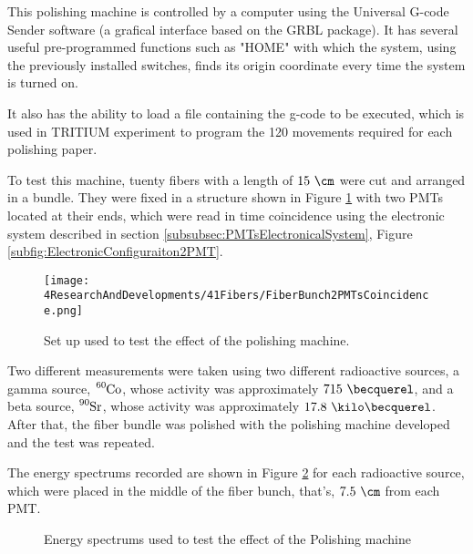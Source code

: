 This polishing machine is controlled by a computer using the Universal G-code Sender software (a grafical interface based on the GRBL package). It has several useful pre-programmed functions such as "HOME" with which the system, using the previously installed switches, finds its origin coordinate every time the system is turned on. 

It also has the ability to load a file containing the g-code to be executed, which is used in TRITIUM experiment to program the 120 movements required for each polishing paper.

To test this machine, tuenty fibers with a length of $15~\cm$ were cut and arranged in a bundle. They were fixed in a structure shown in Figure \ref{fig:BunchWith2PMTsCoincidence} with two PMTs located at their ends, which were read in time coincidence using the electronic system described in section \ref{subsubsec:PMTsElectronicalSystem}, Figure \ref{subfig:ElectronicConfiguraiton2PMT}.

\begin{figure}[]
\centering
\texttt{[image: 4ResearchAndDevelopments/41Fibers/FiberBunch2PMTsCoincidence.png]}
\caption{Set up used to test the effect of the polishing machine.\label{fig:BunchWith2PMTsCoincidence}}
\end{figure}

Two different measurements were taken using two different radioactive sources, a gamma source, $\ce{^{60}Co}$, whose activity was approximately $715~\becquerel$, and a beta source, $\ce{^{90}Sr}$, whose activity was approximately $17.8~\kilo\becquerel$. After that, the fiber bundle was polished with the polishing machine developed and the test was repeated.

The energy spectrums recorded are shown in Figure \ref{fig:ResultsOfPolishingMachine} for each radioactive source, which were placed in the middle of the fiber bunch, that's, $7.5~\cm$ from each PMT.

\begin{figure}[h]
 \centering
    \newline
 \caption{Energy spectrums used to test the effect of the Polishing machine}
 \label{fig:ResultsOfPolishingMachine}
\end{figure}

